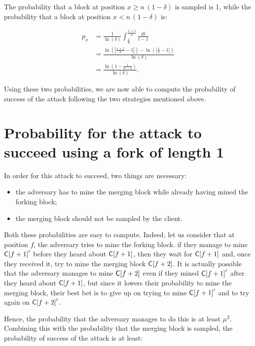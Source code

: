         The probability that a block at position \(x\geqslant n\,(1-\delta)\) is sampled is 1, while the probability that a block at position \(x< n\,(1-\delta)\) is:
        
        \begin{align*}
          p_x &= \frac{1}{\ln(\delta)}\int_{\frac{x}{n}}^{\frac{x+1}{n}}\frac{\mathrm{d}t}{t-1}\\
              &= \frac{\ln\left(\left|\frac{x+1}{n}-1\right|\right)-\ln\left(\left|\frac{x}{n}-1\right|\right)}{\ln(\delta)}\\
              &= \frac{\ln\left(1-\frac{1}{n-x}\right)}{\ln(\delta)}.
        \end{align*}

        Using these two probabilities, we are now able to compute the probability of success of the attack following the two strategies mentioned above.

        \section{Probability for the attack to succeed using a fork of length 1}
          In order for this attack to succeed, two things are necessary:

          \begin{itemize}
            \item the adversary has to mine the merging block while already having mined the forking block;
            \item the merging block should not be sampled by the client.
          \end{itemize}

          Both these probabilities are easy to compute. Indeed, let us consider that at position \(f\), the adversary tries to mine the forking block. if they manage to mine \(\mathsf{C[}f+1\mathsf{]}'\) before they heard about \(\mathsf{C[}f+1\mathsf{]}\), then they wait for \(\mathsf{C[}f+1\mathsf{]}\) and, once they received it, try to mine the merging block \(\mathsf{C[}f+2\mathsf{]}\). It is actually possible that the adversary manages to mine \(\mathsf{C[}f+2\mathsf{]}\) even if they mined \(\mathsf{C[}f+1\mathsf{]}'\) after they heard about \(\mathsf{C[}f+1\mathsf{]}\), but since it lowers their probability to mine the merging block, their best bet is to give up on trying to mine \(\mathsf{C[}f+1\mathsf{]}'\) and to try again on \(\mathsf{C[}f+2\mathsf{]}'\).

          Hence, the probability that the adversary manages to do this is at least \(\mu^2\). Combining this with the probability that the merging block is sampled, the probability of success of the attack is at least:

